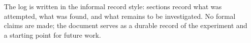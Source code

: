 The log is written in the informal record style: sections record what
was attempted, what was found, and what remains to be investigated.
No formal claims are made; the document serves as a durable record of
the experiment and a starting point for future work.
